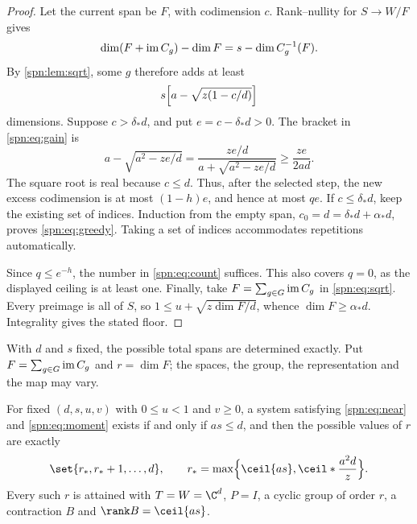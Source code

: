 \begin{proof}
Let the current span be $F$, with codimension $c$. Rank--nullity for
$S\to W/F$ gives
\[
 \dim(F+\operatorname{im} C_g)-\dim F=s-\dim C_g^{-1}(F).
\]
By \cref{spn:lem:sqrt}, some $g$ therefore adds at least
\begin{equation}\label{spn:eq:gain}
 s\Bigl[a-\sqrt{z(1-c/d)}\Bigr]
\end{equation}
dimensions. Suppose $c>\delta_*d$, and put $e=c-\delta_*d>0$. The bracket in
\eqref{spn:eq:gain} is
\[
 a-\sqrt{a^2-ze/d}=\frac{ze/d}{a+\sqrt{a^2-ze/d}}\ge\frac{ze}{2ad}.
\]
The square root is real because $c\le d$. Thus, after the selected step, the
new excess codimension is at most $(1-h)e$, and hence at most $qe$. If
$c\le\delta_*d$, keep the existing set of indices. Induction from the empty
span, $c_0=d=\delta_*d+\alpha_*d$, proves \eqref{spn:eq:greedy}. Taking a set of
indices accommodates repetitions automatically.

Since $q\le e^{-h}$, the number in \eqref{spn:eq:count} suffices. This also
covers $q=0$, as the displayed ceiling is at least one. Finally, take
$F=\sum_{g\in G}\operatorname{im} C_g$ in \eqref{spn:eq:sqrt}. Every preimage is all of
$S$, so $1\le u+\sqrt{z\dim F/d}$, whence $\dim F\ge\alpha_*d$. Integrality
gives the stated floor.
\end{proof}

With $d$ and $s$ fixed, the possible total spans are determined exactly. Put
$F=\sum_{g\in G}\operatorname{im} C_g$ and $r=\dim F$; the spaces, the group, the representation and the map
may vary.

\begin{theorem}\label{spn:thm:rank-spectrum}
For fixed $(d,s,u,v)$ with $0\le u<1$ and $v\ge0$, a system satisfying \eqref{spn:eq:near} and
\eqref{spn:eq:moment} exists if and only if $as\le d$, and then the possible values of $r$ are exactly
\[
 \set{r_*,r_*+1,\dots,d},\qquad r_*=\max\Bigl\{\ceil{as},\ceil*{\frac{a^2d}z}\Bigr\}.
\]
Every such $r$ is attained with $T=W=\C^d$, $P=I$, a cyclic group of order $r$, a contraction $B$
and $\rank B=\ceil{as}$.
\end{theorem}

